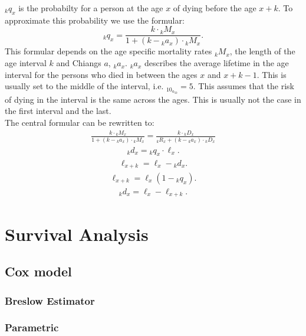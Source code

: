 \documentclass{article}
\begin{document}
\(_kq_x\) is the probabilty for a person at the age \(x\) of dying before the age \(x+k\). To approximate this probability we use the formular:
\begin{equation}\label{k3-dhyppig}
_kq_x= \frac{k\cdot {_kM_x}}{1+(k-{_ka_x})\cdot {_kM_x}}.
\end{equation}
This formular depends on the age specific mortality rates \(_kM_x\), the length of the age interval \(k\) and Chiangs \(a\), \(_ka_x\). \(_ka_x\) describes the average lifetime in the age interval for the persons who died in between the ages \(x\) and \(x+k-1\). This is usually set to the middle of the interval, i.e. \(_10_a_50 = 5\). This assumes that the risk of dying in the interval is the same across the ages. This is usually not the case in the first interval and the last.\\[0pt]
The central formular can be rewritten to:
\begin{align*}
\frac{k\cdot {_kM_x}}{1+(k-{_ka_x})\cdot {_kM_x}} = \frac{k\cdot {_kD_x}}{_kR_x+(k-{_ka_x})\cdot {_kD_x}}
\end{align*}
\begin{align*}
_kd_x = {_kq_x}\cdot \ell_x.
\end{align*}
\begin{align*}
\ell_{x+k} = \ell_x-{_kd_x}.
\end{align*}
\begin{align*}
\ell_{x+k} = \ell_x(1-{_kq_x}).
\end{align*}
\begin{align*}
_kd_x = \ell_x-\ell_{x+k}.
\end{align*}



\section*{Survival Analysis}
\label{sec:org638a02d}

\subsection*{Cox model}
\label{sec:org12ec0b0}

\subsubsection*{Breslow Estimator}
\label{sec:orgfe2ae3b}

\subsubsection*{Parametric}
\label{sec:org7ccd7d4}
\end{document}
